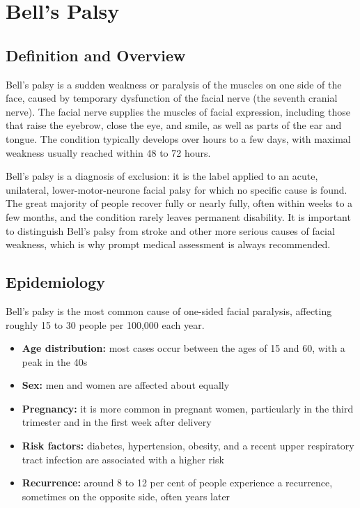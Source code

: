 \chapter{Bell's Palsy}

\section*{Definition and Overview}
Bell's palsy is a sudden weakness or paralysis of the muscles on one side of the face, caused by temporary dysfunction of the facial nerve (the seventh cranial nerve). The facial nerve supplies the muscles of facial expression, including those that raise the eyebrow, close the eye, and smile, as well as parts of the ear and tongue. The condition typically develops over hours to a few days, with maximal weakness usually reached within 48 to 72 hours.

Bell's palsy is a diagnosis of exclusion: it is the label applied to an acute, unilateral, lower-motor-neurone facial palsy for which no specific cause is found. The great majority of people recover fully or nearly fully, often within weeks to a few months, and the condition rarely leaves permanent disability. It is important to distinguish Bell's palsy from stroke and other more serious causes of facial weakness, which is why prompt medical assessment is always recommended.

\section*{Epidemiology}
Bell's palsy is the most common cause of one-sided facial paralysis, affecting roughly 15 to 30 people per 100,000 each year.

\begin{itemize}
    \item \textbf{Age distribution:} most cases occur between the ages of 15 and 60, with a peak in the 40s
    \item \textbf{Sex:} men and women are affected about equally
    \item \textbf{Pregnancy:} it is more common in pregnant women, particularly in the third trimester and in the first week after delivery
    \item \textbf{Risk factors:} diabetes, hypertension, obesity, and a recent upper respiratory tract infection are associated with a higher risk
    \item \textbf{Recurrence:} around 8 to 12 per cent of people experience a recurrence, sometimes on the opposite side, often years later
\end{itemize}

